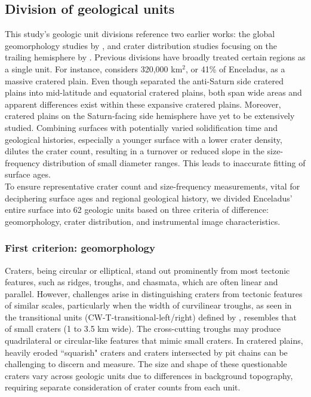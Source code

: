 \documentclass[preprint,12pt,3p,times,authoryear]{elsarticle}
\begin{document}
\subsection{Division of geological units}
\label{app:gu}
This study’s geologic unit divisions reference two earlier works: the global geomorphology studies by \citet{CrowWillard2015}, and crater distribution studies focusing on the trailing hemisphere by \citet{Kirchoff2009}. Previous divisions have broadly treated certain regions as a single unit. For instance, \citet{CrowWillard2015} considers 320,000 km$^{2}$, or 41\% of Enceladus, as a massive cratered plain. Even though \citet{Kirchoff2009} separated the anti-Saturn side cratered plains into mid-latitude and equatorial cratered plains, both span wide areas and apparent differences exist within these expansive cratered plains. Moreover, cratered plains on the Saturn-facing side hemisphere have yet to be extensively studied. Combining surfaces with potentially varied solidification time and geological histories, especially a younger surface with a lower crater density, dilutes the crater count, resulting in a turnover or reduced slope in the size-frequency distribution of small diameter ranges. This leads to inaccurate fitting of surface ages. \\

To ensure representative crater count and size-frequency measurements, vital for deciphering surface ages and regional geological history, we divided Enceladus’ entire surface into 62 geologic units based on three criteria of difference: geomorphology, crater distribution, and instrumental image characteristics.

%
\subsubsection{First criterion: geomorphology}
Craters, being circular or elliptical, stand out prominently from most tectonic features, such as ridges, troughs, and chasmata, which are often linear and parallel. However, challenges arise in distinguishing craters from tectonic features of similar scales, particularly when the width of curvilinear troughs, as seen in the transitional units (CW-T-transitional-left/right) defined by \citet{CrowWillard2015}, resembles that of small craters (1 to 3.5 km wide). The cross-cutting troughs may produce quadrilateral or circular-like features that mimic small craters. In cratered plains, heavily eroded ``squarish" craters and craters intersected by pit chains can be challenging to discern and measure. The size and shape of these questionable craters vary across geologic units due to differences in background topography, requiring separate consideration of crater counts from each unit.\\
\end{document}
